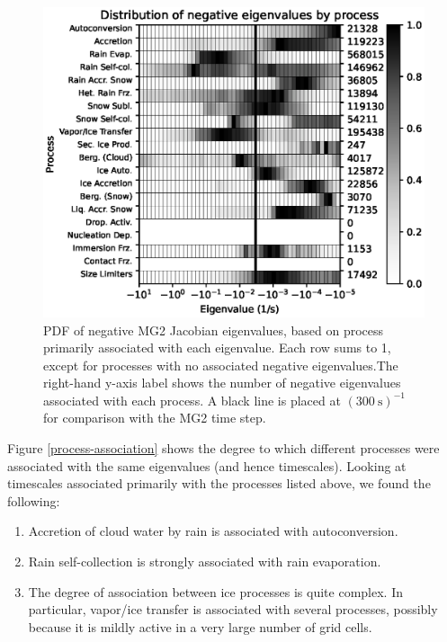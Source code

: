 \documentclass [11pt, proquest] {uwthesis}[2020/02/24]
\begin{document}
\begin{figure}[htbp]
  \includegraphics[width=6.5in]{./time_hist_process_2D_neg.eps}
  \caption[PDF of negative eigenvalues of the Jacobian of MG2, separated by process]{PDF of negative MG2 Jacobian eigenvalues, based on process primarily associated with each eigenvalue. Each row sums to \num{1}, except for processes with no associated negative eigenvalues.The right-hand y-axis label shows the number of negative eigenvalues associated with each process. A black line is placed at $(\SI{300}{\second})^{-1}$ for comparison with the MG2 time step.}
  \label{process-2D-neg-eig}
\end{figure}

Figure \ref{process-association} shows the degree to which different processes were associated with the same eigenvalues (and hence timescales). Looking at timescales associated primarily with the processes listed above, we found the following:

\begin{enumerate}
\item Accretion of cloud water by rain is associated with autoconversion.
\item Rain self-collection is strongly associated with rain evaporation.
\item The degree of association between ice processes is quite complex. In particular, vapor/ice transfer is associated with several processes, possibly because it is mildly active in a very large number of grid cells.
\end{enumerate}
\end{document}
